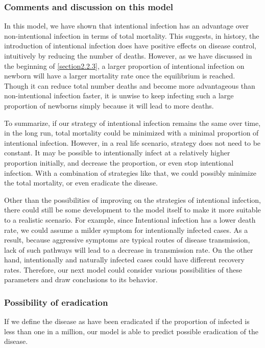 \documentclass[12pt]{article}
\begin{document}
\subsubsection{Comments and discussion on this model}

In this model, we have shown that intentional infection has an advantage over non-intentional infection in terms of total mortality. This suggests, in history, the introduction of intentional infection does have positive effects on disease control, intuitively by reducing the number of deaths. However, as we have discussed in the beginning of \autoref{section2.2.3}, a larger proportion of intentional infection on newborn will have a larger mortality rate once the equilibrium is reached. Though it can reduce total number deaths and become more advantageous than non-intentional infection faster, it is unwise to keep infecting such a large proportion of newborns simply because it will lead to more deaths. 

To summarize, if our strategy of intentional infection remains the same over time, in the long run, total mortality could be minimized with a minimal proportion of intentional infection. However, in a real life scenario, strategy does not need to be constant. It may be possible to intentionally infect at a relatively higher proportion initially, and decrease the proportion, or even stop intentional infection. With a combination of strategies like that, we could possibly minimize the total mortality, or even eradicate the disease.

Other than the possibilities of improving on the strategies of intentional infection, there could still be some development to the model itself to make it more suitable to a realistic scenario. For example, since Intentional infection has a lower death rate, we could assume a milder symptom for intentionally infected cases. As a result, because aggressive symptoms are typical routes of disease transmission, lack of such pathways will lead to a decrease in transmission rate. On the other hand, intentionally and naturally infected cases could have different recovery rates. Therefore, our next model could consider various possibilities of these parameters and draw conclusions to its behavior.

\subsubsection{Possibility of eradication}
If we define the disease as have been eradicated if the proportion of infected is less than one in a million, our model is able to predict possible eradication of the disease.
\end{document}

